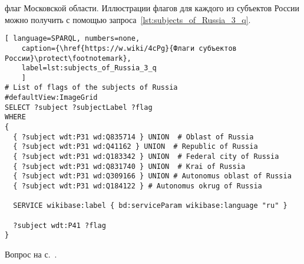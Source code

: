 \begin{task}
\label{answer:subjects_of_Russia_3}
 флаг Московской области. 
    Иллюстрации флагов для каждого из субъектов России 
    можно получить с помощью запроса~\ref{lst:subjects_of_Russia_3_q}.
	
	\begin{lstlisting}[ language=SPARQL, numbers=none,
	caption={\href{https://w.wiki/4cPg}{Флаги субъектов России}\protect\footnotemark},
	label=lst:subjects_of_Russia_3_q
	]
# List of flags of the subjects of Russia
#defaultView:ImageGrid
SELECT ?subject ?subjectLabel ?flag
WHERE
{
  { ?subject wdt:P31 wd:Q835714 } UNION  # Oblast of Russia
  { ?subject wdt:P31 wd:Q41162 } UNION  # Republic of Russia
  { ?subject wdt:P31 wd:Q183342 } UNION  # Federal city of Russia
  { ?subject wdt:P31 wd:Q831740 } UNION  # Krai of Russia
  { ?subject wdt:P31 wd:Q309166 } UNION # Autonomus oblast of Russia
  { ?subject wdt:P31 wd:Q184122 } # Autonomus okrug of Russia
  
  SERVICE wikibase:label { bd:serviceParam wikibase:language "ru" }
   
  ?subject wdt:P41 ?flag
}
\end{lstlisting}
	
\small{\AnswerBackref Вопрос на с.~\pageref{lst:oblast-of-Russia}.}
\end{task}



